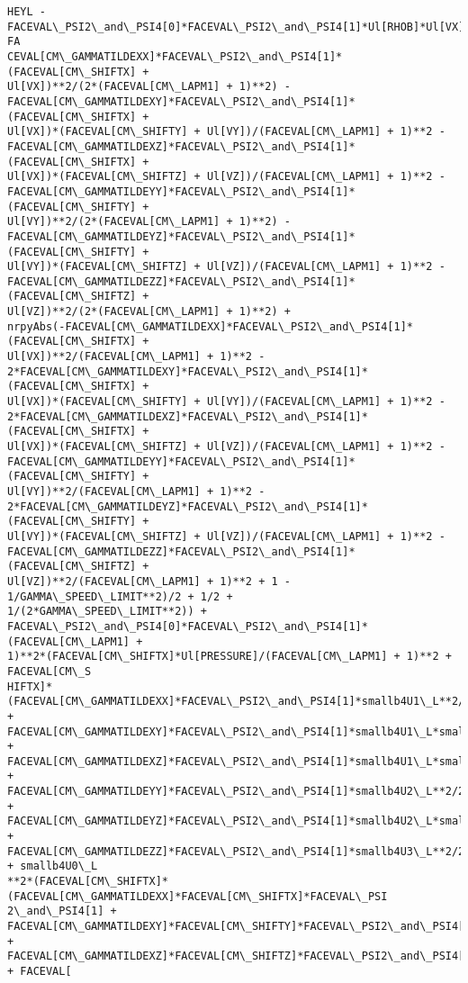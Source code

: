 \documentclass[landscape,letterpaper,10pt,english]{article}
\begin{document}
\begin{Verbatim}[commandchars=\\\{\}]
HEYL -FACEVAL\_PSI2\_and\_PSI4[0]*FACEVAL\_PSI2\_and\_PSI4[1]*Ul[RHOB]*Ul[VX]/sqrt(-FA
CEVAL[CM\_GAMMATILDEXX]*FACEVAL\_PSI2\_and\_PSI4[1]*(FACEVAL[CM\_SHIFTX] +
Ul[VX])**2/(2*(FACEVAL[CM\_LAPM1] + 1)**2) -
FACEVAL[CM\_GAMMATILDEXY]*FACEVAL\_PSI2\_and\_PSI4[1]*(FACEVAL[CM\_SHIFTX] +
Ul[VX])*(FACEVAL[CM\_SHIFTY] + Ul[VY])/(FACEVAL[CM\_LAPM1] + 1)**2 -
FACEVAL[CM\_GAMMATILDEXZ]*FACEVAL\_PSI2\_and\_PSI4[1]*(FACEVAL[CM\_SHIFTX] +
Ul[VX])*(FACEVAL[CM\_SHIFTZ] + Ul[VZ])/(FACEVAL[CM\_LAPM1] + 1)**2 -
FACEVAL[CM\_GAMMATILDEYY]*FACEVAL\_PSI2\_and\_PSI4[1]*(FACEVAL[CM\_SHIFTY] +
Ul[VY])**2/(2*(FACEVAL[CM\_LAPM1] + 1)**2) -
FACEVAL[CM\_GAMMATILDEYZ]*FACEVAL\_PSI2\_and\_PSI4[1]*(FACEVAL[CM\_SHIFTY] +
Ul[VY])*(FACEVAL[CM\_SHIFTZ] + Ul[VZ])/(FACEVAL[CM\_LAPM1] + 1)**2 -
FACEVAL[CM\_GAMMATILDEZZ]*FACEVAL\_PSI2\_and\_PSI4[1]*(FACEVAL[CM\_SHIFTZ] +
Ul[VZ])**2/(2*(FACEVAL[CM\_LAPM1] + 1)**2) +
nrpyAbs(-FACEVAL[CM\_GAMMATILDEXX]*FACEVAL\_PSI2\_and\_PSI4[1]*(FACEVAL[CM\_SHIFTX] +
Ul[VX])**2/(FACEVAL[CM\_LAPM1] + 1)**2 -
2*FACEVAL[CM\_GAMMATILDEXY]*FACEVAL\_PSI2\_and\_PSI4[1]*(FACEVAL[CM\_SHIFTX] +
Ul[VX])*(FACEVAL[CM\_SHIFTY] + Ul[VY])/(FACEVAL[CM\_LAPM1] + 1)**2 -
2*FACEVAL[CM\_GAMMATILDEXZ]*FACEVAL\_PSI2\_and\_PSI4[1]*(FACEVAL[CM\_SHIFTX] +
Ul[VX])*(FACEVAL[CM\_SHIFTZ] + Ul[VZ])/(FACEVAL[CM\_LAPM1] + 1)**2 -
FACEVAL[CM\_GAMMATILDEYY]*FACEVAL\_PSI2\_and\_PSI4[1]*(FACEVAL[CM\_SHIFTY] +
Ul[VY])**2/(FACEVAL[CM\_LAPM1] + 1)**2 -
2*FACEVAL[CM\_GAMMATILDEYZ]*FACEVAL\_PSI2\_and\_PSI4[1]*(FACEVAL[CM\_SHIFTY] +
Ul[VY])*(FACEVAL[CM\_SHIFTZ] + Ul[VZ])/(FACEVAL[CM\_LAPM1] + 1)**2 -
FACEVAL[CM\_GAMMATILDEZZ]*FACEVAL\_PSI2\_and\_PSI4[1]*(FACEVAL[CM\_SHIFTZ] +
Ul[VZ])**2/(FACEVAL[CM\_LAPM1] + 1)**2 + 1 - 1/GAMMA\_SPEED\_LIMIT**2)/2 + 1/2 +
1/(2*GAMMA\_SPEED\_LIMIT**2)) +
FACEVAL\_PSI2\_and\_PSI4[0]*FACEVAL\_PSI2\_and\_PSI4[1]*(FACEVAL[CM\_LAPM1] +
1)**2*(FACEVAL[CM\_SHIFTX]*Ul[PRESSURE]/(FACEVAL[CM\_LAPM1] + 1)**2 + FACEVAL[CM\_S
HIFTX]*(FACEVAL[CM\_GAMMATILDEXX]*FACEVAL\_PSI2\_and\_PSI4[1]*smallb4U1\_L**2/2 +
FACEVAL[CM\_GAMMATILDEXY]*FACEVAL\_PSI2\_and\_PSI4[1]*smallb4U1\_L*smallb4U2\_L +
FACEVAL[CM\_GAMMATILDEXZ]*FACEVAL\_PSI2\_and\_PSI4[1]*smallb4U1\_L*smallb4U3\_L +
FACEVAL[CM\_GAMMATILDEYY]*FACEVAL\_PSI2\_and\_PSI4[1]*smallb4U2\_L**2/2 +
FACEVAL[CM\_GAMMATILDEYZ]*FACEVAL\_PSI2\_and\_PSI4[1]*smallb4U2\_L*smallb4U3\_L +
FACEVAL[CM\_GAMMATILDEZZ]*FACEVAL\_PSI2\_and\_PSI4[1]*smallb4U3\_L**2/2 + smallb4U0\_L
**2*(FACEVAL[CM\_SHIFTX]*(FACEVAL[CM\_GAMMATILDEXX]*FACEVAL[CM\_SHIFTX]*FACEVAL\_PSI
2\_and\_PSI4[1] +
FACEVAL[CM\_GAMMATILDEXY]*FACEVAL[CM\_SHIFTY]*FACEVAL\_PSI2\_and\_PSI4[1] +
FACEVAL[CM\_GAMMATILDEXZ]*FACEVAL[CM\_SHIFTZ]*FACEVAL\_PSI2\_and\_PSI4[1]) + FACEVAL[

\end{Verbatim}
\end{document}
